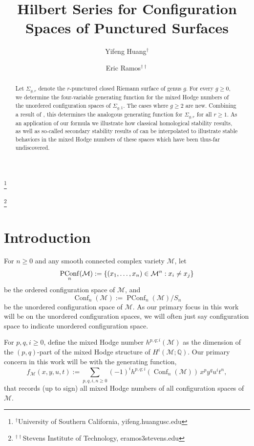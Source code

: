 \documentclass[11pt,reqno]{amsproc}
\numberwithin{equation}{section}
\theoremstyle{definition}
\theoremstyle{remark}
\newcommand\Q{{\mathbb Q}}
\DeclarePairedDelimiter{\set}{\{}{\}}
\DeclareMathOperator{\Conf}{Conf}
\DeclareMathOperator{\PConf}{PConf}
\begin{document}
\title{Hilbert Series for Configuration Spaces of Punctured Surfaces}
\author{Yifeng Huang$^\dagger$}
\thanks{$^\dagger$University of Southern California, yifeng.huangusc.edu}
\author{Eric Ramos$^{\dagger\dagger}$}
\thanks{$^{\dagger\dagger}$Stevens Institute of Technology, eramos3stevens.edu}
\date{}
\begin{abstract}
Let $\Sigma_{g,r}$ denote the $r$-punctured closed Riemann surface of genus $g$. For every $g\geq 0$, we determine the four-variable generating function for the mixed Hodge numbers of the unordered configuration spaces of $\Sigma_{g,1}$. The cases where $g\geq 2$ are new. Combining a result of \cite{huang2020cohomology}, this determines the analogous generating function for $\Sigma_{g,r}$ for all $r\geq 1$. As an application of our formula we illustrate how classical homological stability results, as well as so-called secondary stability results of \cite{miller2019higher} can be interpolated to illustrate stable behaviors in the mixed Hodge numbers of these spaces which have been thus-far undiscovered.
\end{abstract}
\maketitle

\section{Introduction}
For $n\geq 0$ and any smooth connected complex variety $\mathcal{M}$, let
\begin{equation}
\PConf_n(\mathcal{M}):=\set{(x_1,\dots,x_n)\in \mathcal{M}^n: x_i\neq x_j}
\end{equation}
be the ordered configuration space of $\mathcal{M}$, and
\begin{equation}
\Conf_n(\mathcal{M}):=\PConf_n(\mathcal{M})/S_n
\end{equation}
be the unordered configuration space of $\mathcal{M}$. As our primary focus in this work will be on the unordered configuration spaces, we will often just say configuration space to indicate unordered configuration space.

For $p,q,i\geq 0$, define the mixed Hodge number $h^{p,q;i}(\mathcal{M})$ as the dimension of the $(p,q)$-part of the mixed Hodge structure of $H^i(\mathcal{M};\Q)$. Our primary concern in this work will be with the generating function, 
\begin{equation}
f_\mathcal{M}(x,y,u,t):=\sum_{p,q,i,n\geq 0} (-1)^i h^{p,q;i}(\Conf_n(\mathcal{M}))\, x^p y^q u^i t^n,
\end{equation}
that records (up to sign) all mixed Hodge numbers of all configuration spaces of $\mathcal{M}$.
\end{document}
